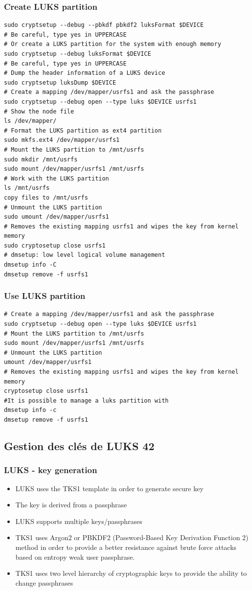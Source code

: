 \documentclass[resume]{subfiles}
\begin{document}
\subsubsection{Create LUKS partition}
\begin{lstlisting}[style=bash,label={},caption={}]
sudo cryptsetup --debug --pbkdf pbkdf2 luksFormat $DEVICE
# Be careful, type yes in UPPERCASE
# Or create a LUKS partition for the system with enough memory
sudo cryptsetup --debug luksFormat $DEVICE
# Be careful, type yes in UPPERCASE
# Dump the header information of a LUKS device
sudo cryptsetup luksDump $DEVICE
# Create a mapping /dev/mapper/usrfs1 and ask the passphrase
sudo cryptsetup --debug open --type luks $DEVICE usrfs1
# Show the node file
ls /dev/mapper/
# Format the LUKS partition as ext4 partition
sudo mkfs.ext4 /dev/mapper/usrfs1
# Mount the LUKS partition to /mnt/usrfs
sudo mkdir /mnt/usrfs
sudo mount /dev/mapper/usrfs1 /mnt/usrfs
# Work with the LUKS partition
ls /mnt/usrfs
copy files to /mnt/usrfs
# Unmount the LUKS partition
sudo umount /dev/mapper/usrfs1
# Removes the existing mapping usrfs1 and wipes the key from kernel memory
sudo cryptosetup close usrfs1
# dmsetup: low level logical volume management
dmsetup info -C
dmsetup remove -f usrfs1
\end{lstlisting}

\subsubsection{Use LUKS partition}
\begin{lstlisting}[style=bash,label={},caption={}]
# Create a mapping /dev/mapper/usrfs1 and ask the passphrase
sudo cryptsetup --debug open --type luks $DEVICE usrfs1
# Mount the LUKS partition to /mnt/usrfs
sudo mount /dev/mapper/usrfs1 /mnt/usrfs
# Unmount the LUKS partition
umount /dev/mapper/usrfs1
# Removes the existing mapping usrfs1 and wipes the key from kernel memory
cryptosetup close usrfs1
#It is possible to manage a luks partition with
dmsetup info -c
dmsetup remove -f usrfs1
\end{lstlisting}


\subsection{Gestion des clés de LUKS 42}
\subsubsection{LUKS - key generation}
\begin{itemize}
\item LUKS uses the TKS1 template in order to generate secure key
\item The key is derived from a passphrase
\item LUKS supports multiple keys/passphrases
\item TKS1 uses Argon2 or PBKDF2 (Password-Based Key Derivation Function 2) method in order to provide a better resistance against brute force attacks based on entropy weak user passphrase.
\item TKS1 uses two level hierarchy of cryptographic keys to provide the ability to change passphrases
\end{itemize}
\end{document}
